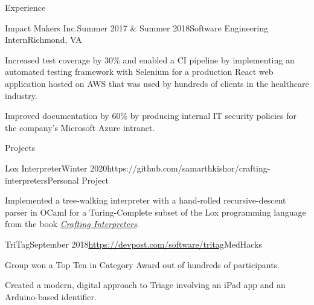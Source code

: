 \documentclass{resume}
\begin{document}
\begin{rSection}{Experience}
  \begin{rSubsection}{Impact Makers Inc.}{Summer 2017 \& Summer 2018}{Software Engineering Intern}{Richmond, VA}
    \item Increased test coverage by 30\% and enabled a CI pipeline by implementing an automated testing framework with Selenium for a production React web application hosted on AWS that was used by hundreds of clients in the healthcare industry.
    \item Improved documentation by 60\% by producing internal IT security policies for the company's Microsoft Azure intranet.
  \end{rSubsection}

\end{rSection}

\begin{rSection}{Projects}

  \begin{rSubsection}{Lox Interpreter}{Winter 2020}{https://github.com/samarthkishor/crafting-interpreters}{Personal Project}
    \item Implemented a tree-walking interpreter with a hand-rolled recursive-descent parser in OCaml for a Turing-Complete subset of the Lox programming language from the book \href{https://craftinginterpreters.com/}{\textit{Crafting Interpreters}}.
  \end{rSubsection}

  \begin{rSubsection}{TriTag}{September 2018}{\url{https://devpost.com/software/tritag}}{MedHacks}
    \item Group won a Top Ten in Category Award out of hundreds of participants.
    \item Created a modern, digital approach to Triage involving an iPad app and an Arduino-based identifier.
  \end{rSubsection}

\end{rSection}
\end{document}
